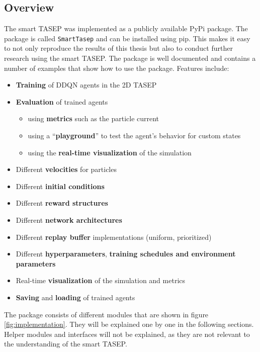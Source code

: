 \subsection{Overview}
\label{subsec:implementation-overview}
The smart TASEP was implemented as a publicly available PyPi package. The package is called \texttt{SmartTasep} and can be installed using pip. This makes it easy to not only reproduce the results of this thesis but also to conduct further research using the smart TASEP. The package is well documented and contains a number of examples that show how to use the package. Features include:
\begin{itemize}
    \item \textbf{Training} of DDQN agents in the 2D TASEP
    \item \textbf{Evaluation} of trained agents
    \begin{itemize}
        \item using \textbf{metrics} such as the particle current
        \item using a \enquote{\textbf{playground}} to test the agent's behavior for custom states
        \item using the \textbf{real-time visualization} of the simulation
    \end{itemize} 
    \item Different \textbf{velocities} for particles
    \item Different \textbf{initial conditions}
    \item Different \textbf{reward structures}
    \item Different \textbf{network architectures}
    \item Different \textbf{replay buffer} implementations (uniform, prioritized)
    \item Different \textbf{hyperparameters}, \textbf{training schedules and environment parameters}
    \item Real-time \textbf{visualization} of the simulation and metrics
    \item \textbf{Saving} and \textbf{loading} of trained agents
\end{itemize}
The package consists of different modules that are shown in figure \ref{fig:implementation}. They will be explained one by one in the following sections. Helper modules and interfaces will not be explained, as they are not relevant to the understanding of the smart TASEP. 

